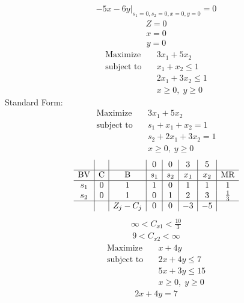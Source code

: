 \documentclass{article}
\begin{document}
\begin{align*}
\left.-5x - 6y\right|_{s_{1}=0,s_{2}=0,x=0,y=0}=0\end{align*}
\begin{align*}
Z=0\end{align*}
\begin{align*}
x=0\end{align*}
\begin{align*}
y=0\end{align*}
\begin{align*}
\text{Maximize} \quad & 3x_{1} + 5x_{2}\\
\text{subject to} \quad
& x_{1} + x_{2}\le1\\
& 2x_{1} + 3x_{2}\le1\\
& x\ge0,\; y\ge0\end{align*}
Standard Form:\\
\begin{align*}
\text{Maximize} \quad & 3x_{1} + 5x_{2}\\
\text{subject to} \quad
& s_{1} + x_{1} + x_{2}=1\\
& s_{2} + 2x_{1} + 3x_{2}=1\\
& x\ge0,\; y\ge0\end{align*}
\begin{align*}
\begin{array}{c|c|c|c|c|c|c|c}
 &  &  & 0 & 0 & 3 & 5 & \\
\hline
\text{BV} & \text{C} & \text{B} & s_{1} & s_{2} & x_{1} & x_{2} & \text{MR} \\
\hline
s_{1} & 0 & 1 & 1 & 0 & 1 & 1 & 1 \\
s_{2} & 0 & 1 & 0 & 1 & 2 & 3 & \frac{1}{3} \\
\hline
 &  & Z_j-C_j & 0 & 0 & -3 & -5 & \\
\end{array}
\end{align*}
\begin{align*}
\infty<C_{x1}<\frac{10}{3}\end{align*}
\begin{align*}
9<C_{x2}<\infty\end{align*}
\begin{align*}
\text{Maximize} \quad & x + 4y\\
\text{subject to} \quad
& 2x + 4y\le7\\
& 5x + 3y\le15\\
& x\ge0,\; y\ge0\end{align*}
\begin{align*}
2x + 4y=7\end{align*}
\end{document}
